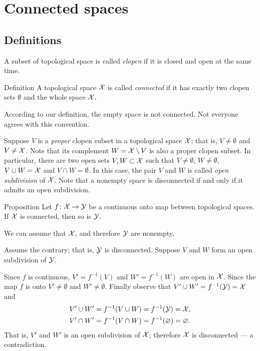 \chapter{Connected spaces}

\section{Definitions}

A subset of topological space is called \emph{clopen} if it is closed and open at the same time.

\begin{thm}{Definition}
A topological space $\mathcal{X}$ is called \emph{connected} if it has exactly two clopen sets $\emptyset$ and the whole space $\mathcal{X}$.
\end{thm}

According to our definition, the empty space is not connected.
Not everyone agrees with this convention.

Suppose $V$ is a \emph{proper} clopen subset in a topological space $\mathcal{X}$; that is, $V\ne\emptyset$ and $V\ne\mathcal{X}$.
Note that its complement $W=\mathcal{X}\setminus V$ is also a proper clopen subset.
In particular, there are two open sets $V,W\subset \mathcal{X}$ such that $V\ne\emptyset$, $W\ne\emptyset$, $V\cup W=\mathcal{X}$ and $V\cap W=\emptyset$.
In this case, the pair $V$ and $W$ is called \emph{open subdivision} of $\mathcal{X}$.
Note that a nonempty space is disconnected if and only if it admits an open subdivision. 

\begin{thm}{Proposition}\label{prop:image-connected}
Let $f\colon\mathcal{X}\to \mathcal{Y}$ be a continuous onto map between topological spaces.
If $\mathcal{X}$ is connected, then so is $\mathcal{Y}$.
\end{thm}

We can assume that $\mathcal{X}$, and therefore $\mathcal{Y}$ are nonempty.

Assume the contrary; that is, $\mathcal{Y}$ is disconnected.
Suppose $V$ and $W$ form an open subdivision of $\mathcal{Y}$.

Since $f$ is continuous, $V'=f^{-1}(V)$ and $W'=f^{-1}(W)$ are open in $\mathcal{X}$.
Since the map $f$ is onto $V'\ne\emptyset$ and $W'\ne\emptyset$.
Finally observe that $V'\cup W'=f^{-1}(\mathcal{Y}) =\mathcal{X}$ and
\begin{align*}
V'\cup W'&=f^{-1}(V\cup W)=f^{-1}(\mathcal{Y})=\mathcal{X},
\\
V'\cap W'&=f^{-1}(V\cap W)=f^{-1}(\varnothing)=\varnothing.
\end{align*}
That is, $V'$ and $W'$ is an open subdivision of $\mathcal{X}$; 
therefore $\mathcal{X}$ is disconnected --- a contradiction.
\qeds

